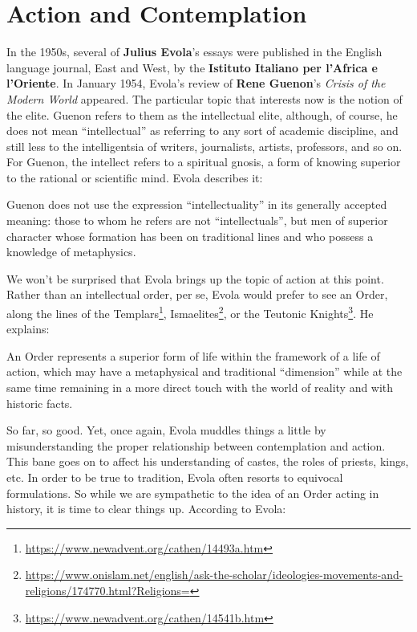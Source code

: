 \section{Action and Contemplation}

In the 1950s, several of \textbf{Julius Evola}'s essays were published in the English language journal, East and West, by the \textbf{Istituto Italiano per l'Africa e l'Oriente}. In January 1954, Evola's review of \textbf{Rene Guenon}'s \textit{Crisis of the Modern World} appeared. The particular topic that interests now is the notion of the elite. Guenon refers to them as the intellectual elite, although, of course, he does not mean ``intellectual'' as referring to any sort of academic discipline, and still less to the intelligentsia of writers, journalists, artists, professors, and so on. For Guenon, the intellect refers to a spiritual gnosis, a form of knowing superior to the rational or scientific mind. Evola describes it:

\begin{quotex}
Guenon does not use the expression ``intellectuality'' in its generally accepted meaning: those to whom he refers are not ``intellectuals'', but men of superior character whose formation has been on traditional lines and who possess a knowledge of metaphysics.
\end{quotex}


We won't be surprised that Evola brings up the topic of action at this point. Rather than an intellectual order, per se, Evola would prefer to see an Order, along the lines of the Templars\footnote{\url{https://www.newadvent.org/cathen/14493a.htm}}, Ismaelites\footnote{\url{https://www.onislam.net/english/ask-the-scholar/ideologies-movements-and-religions/174770.html?Religions=}}, or the Teutonic Knights\footnote{\url{https://www.newadvent.org/cathen/14541b.htm}}. He explains:

\begin{quotex}
An Order represents a superior form of life within the framework of a life of action, which may have a metaphysical and traditional ``dimension'' while at the same time remaining in a more direct touch with the world of reality and with historic facts.
\end{quotex}


So far, so good. Yet, once again, Evola muddles things a little by misunderstanding the proper relationship between contemplation and action. This bane goes on to affect his understanding of castes, the roles of priests, kings, etc. In order to be true to tradition, Evola often resorts to equivocal formulations. So while we are sympathetic to the idea of an Order acting in history, it is time to clear things up. According to Evola:

